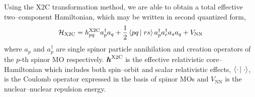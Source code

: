 Using the X2C transformation method, we are able to obtain a total effective
two--component Hamiltonian, which may be written in second quantized form,
\begin{equation}
\mathcal{H}_\mathrm{X2C} = h_{pq}^\mathrm{X2C}a_p^\dagger a_q + 
  \frac{1}{2} \left\langle pq \left\vert\right. rs \right\rangle a_p^\dagger a_r^\dagger a_s a_q + V_\mathrm{NN}
  \label{eq:X2CHam}
\end{equation}
where $a_p$ and $a_p^\dagger$ are single spinor particle annihilation and
creation operators of the $p$-th spinor MO respectively. $\boldsymbol{h}^\mathrm{X2C}$
is the effective relativistic core--Hamiltonian which includes both spin--orbit
and scalar relativistic effects, $\left\langle \cdot \left\vert\right. \cdot \right\rangle$, is the Coulomb operator
expressed in the basis of spinor MOs and $V_\mathrm{NN}$ is the nuclear--nuclear
repulsion energy. 
